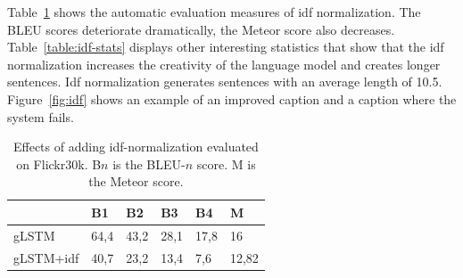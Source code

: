 \documentclass[twoside,twocolumn]{article}
\begin{document}
	Table~\ref{table:results_idf} shows the automatic evaluation measures of idf normalization. The BLEU scores deteriorate dramatically, the Meteor score also decreases. Table~\ref{table:idf-stats} displays other interesting statistics that show that the idf normalization increases the creativity of the language model and creates longer sentences. Idf normalization generates sentences with an average length of 10.5. Figure~\ref{fig:idf} shows an example of an improved caption and a caption where the system fails.
	
	\begin{table}
		\centering
		\begin{tabular}{llllll}
			~                  & B1 & B2 & B3 & B4 & M \\ \hline
			gLSTM        & 64,4   & 43,2            & 28,1   & 17,8   & 16 \\
			gLSTM+idf   & 40,7   & 23,2   & 13,4   & 7,6 & 12,82 \\ \hline
			
		\end{tabular}
		
		\caption{Effects of adding idf-normalization evaluated on Flickr30k. B$n$ is the BLEU-$n$ score. M is the Meteor score.}
		\label{table:results_idf}
	\end{table}
	
\end{document}
